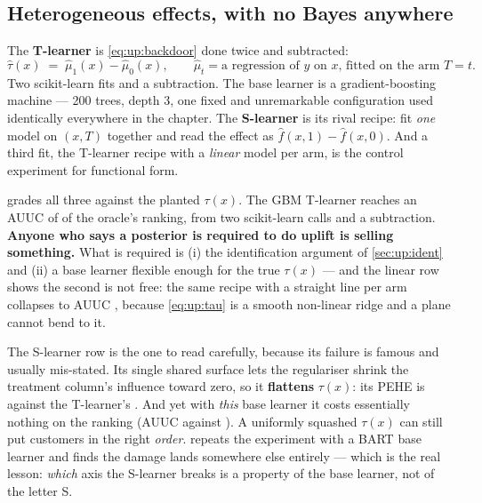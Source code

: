 \subsection*{Heterogeneous effects, with no Bayes anywhere}

The \textbf{T-learner} \citep{kunzel2019} is \cref{eq:up:backdoor} done twice and subtracted:
%
\begin{equation}
  \hat\tau(x) \;=\; \hat\mu_1(x) - \hat\mu_0(x),
  \qquad \hat\mu_t = \text{a regression of $y$ on $x$, fitted on the arm } T = t .
  \label{eq:up:tlearner}
\end{equation}
%
Two scikit-learn fits and a subtraction. The base learner is a gradient-boosting machine
\citep{friedman2001} --- 200 trees, depth 3, one fixed and unremarkable configuration used
identically everywhere in the chapter. The \textbf{S-learner} is its rival recipe: fit
\emph{one} model on $(x, T)$ together and read the effect as
$\hat f(x, 1) - \hat f(x, 0)$. And a third fit, the T-learner recipe with a \emph{linear} model
per arm, is the control experiment for functional form.

 grades all three against the planted $\tau(x)$. The GBM T-learner reaches an
AUUC of \nbOneGbmTAuuc{} of the oracle's ranking, from two scikit-learn calls and a subtraction.
\textbf{Anyone who says a posterior is required to do uplift is selling something.} What is
required is (i) the identification argument of \cref{sec:up:ident} and (ii) a base learner
flexible enough for the true $\tau(x)$ --- and the linear row shows the second is not free: the
same recipe with a straight line per arm collapses to AUUC \nbOneOlsTAuuc, because
\cref{eq:up:tau} is a smooth non-linear ridge and a plane cannot bend to it.



The S-learner row is the one to read carefully, because its failure is famous and usually
mis-stated. Its single shared surface lets the regulariser shrink the treatment column's
influence toward zero, so it \textbf{flattens} $\tau(x)$: its PEHE is \eur{\nbOneGbmSPehe}
against the T-learner's \eur{\nbOneGbmTPehe}. And yet with \emph{this} base learner it costs
essentially nothing on the ranking (AUUC \nbOneGbmSAuuc{} against \nbOneGbmTAuuc). A uniformly
squashed $\tau(x)$ can still put customers in the right \emph{order}.  repeats
the experiment with a BART base learner and finds the damage lands somewhere else entirely ---
which is the real lesson: \emph{which} axis the S-learner breaks is a property of the base
learner, not of the letter S.

